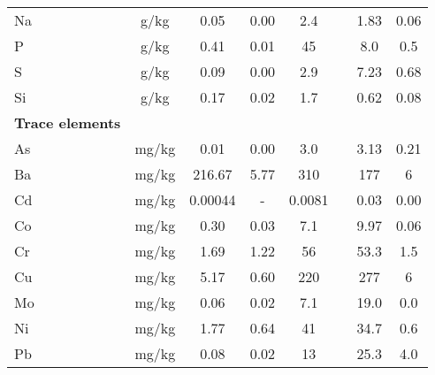 \begin{table}
{\begin{threeparttable}
\begin{tabular}{lccccccc}
Na                         & g/kg      & 0.05              & 0.00             & 2.4              &                   & 1.83            & 0.06               \\
P                          & g/kg      & 0.41              & 0.01             & 45               &                   & 8.0             & 0.5                \\
S                         & g/kg      & 0.09              & 0.00             & 2.9              &                   & 7.23            & 0.68               \\
Si                         & g/kg      & 0.17              & 0.02             & 1.7              &                   & 0.62            & 0.08               \\ \addlinespace \hline \addlinespace
\textbf{Trace elements} &&&&&&&    \\ \hline \addlinespace
As                         & mg/kg     & 0.01              & 0.00             & 3.0              &                   & 3.13            & 0.21               \\
Ba                        & mg/kg     & 216.67            & 5.77             & 310              &                   & 177             & 6                  \\
Cd                        & mg/kg     & 0.00044           & -                & 0.0081           &                   & 0.03            & 0.00               \\
Co                        & mg/kg     & 0.30              & 0.03             & 7.1              &                   & 9.97            & 0.06               \\
Cr                        & mg/kg     & 1.69              & 1.22             & 56               &                   & 53.3            & 1.5                \\
Cu                        & mg/kg     & 5.17              & 0.60             & 220              &                   & 277             & 6                  \\
Mo                       & mg/kg     & 0.06              & 0.02             & 7.1              &                   & 19.0            & 0.0                \\
Ni                        & mg/kg     & 1.77              & 0.64             & 41               &                   & 34.7            & 0.6                \\
Pb                       & mg/kg     & 0.08              & 0.02             & 13               &                   & 25.3            & 4.0                \\

\end{tabular}
\end{threeparttable}}
\end{table}
